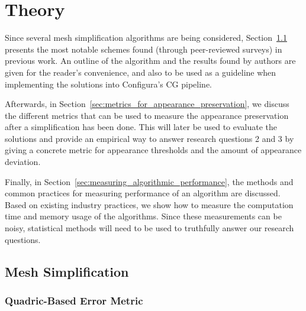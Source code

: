 
\chapter{Theory} \label{ch:theory}

Since several mesh simplification algorithms are being considered, Section~\ref{sec:mesh_simplification} presents the most notable schemes found (through peer-reviewed surveys) in previous work. An outline of the algorithm and the results found by authors are given for the reader's convenience, and also to be used as a guideline when implementing the solutions into Configura's CG pipeline.

Afterwards, in Section~\ref{sec:metrics_for_appearance_preservation}, we discuss the different metrics that can be used to measure the appearance preservation after a simplification has been done. This will later be used to evaluate the solutions and provide an empirical way to answer research questions 2 and 3 by giving a concrete metric for appearance thresholds and the amount of appearance deviation.

Finally, in Section~\ref{sec:measuring_algorithmic_performance}, the methods and common practices for measuring performance of an algorithm are discussed. Based on existing industry practices, we show how to measure the computation time and memory usage of the algorithms. Since these measurements can be noisy, statistical methods will need to be used to truthfully answer our research questions.


\section{Mesh Simplification} \label{sec:mesh_simplification}

\subsection{Quadric-Based Error Metric} \label{sec:quadric-based_error_metric}

